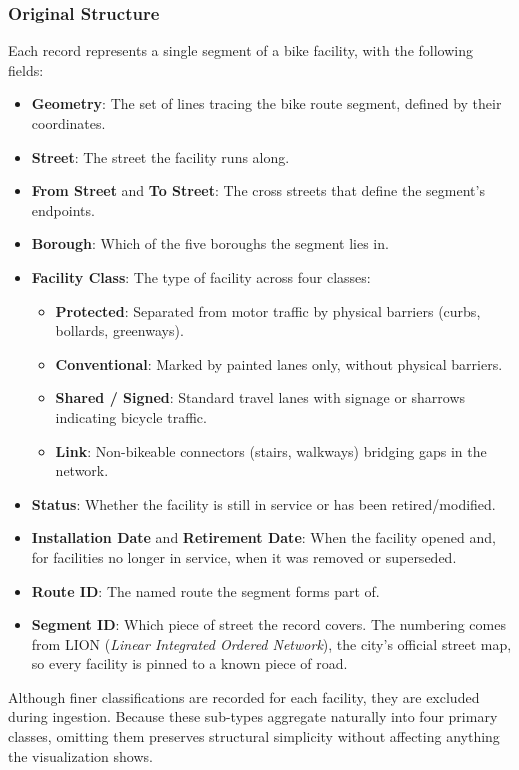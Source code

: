 \subsubsection{Original Structure}
Each record represents a single segment of a bike facility, with the following fields:
\begin{itemize}
    \item \textbf{Geometry}: The set of lines tracing the bike route segment, defined by their coordinates.
    \item \textbf{Street}: The street the facility runs along.
    \item \textbf{From Street} and \textbf{To Street}: The cross streets that define the segment's endpoints.
    \item \textbf{Borough}: Which of the five boroughs the segment lies in.
    \item \textbf{Facility Class}: The type of facility across four classes:
    \begin{itemize}
        \item \textbf{Protected}: Separated from motor traffic by physical barriers (curbs, bollards, greenways).
        \item \textbf{Conventional}: Marked by painted lanes only, without physical barriers.
        \item \textbf{Shared / Signed}: Standard travel lanes with signage or sharrows indicating bicycle traffic.
        \item \textbf{Link}: Non-bikeable connectors (stairs, walkways) bridging gaps in the network.
    \end{itemize}
    \item \textbf{Status}: Whether the facility is still in service or has been retired/modified.
    \item \textbf{Installation Date} and \textbf{Retirement Date}: When the facility opened and, for facilities no longer in service, when it was removed or superseded.
    \item \textbf{Route ID}: The named route the segment forms part of.
    \item \textbf{Segment ID}: Which piece of street the record covers. The numbering comes from LION (\emph{Linear Integrated Ordered Network}), the city's official street map, so every facility is pinned to a known piece of road.
\end{itemize}
Although finer classifications are recorded for each facility, they are excluded during ingestion.
Because these sub-types aggregate naturally into four primary classes, omitting them preserves structural simplicity without affecting anything the visualization shows.

